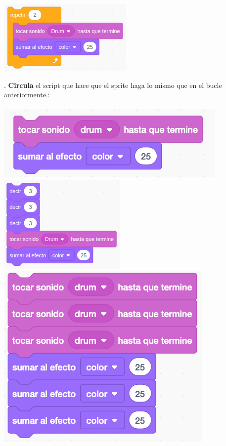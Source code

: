\documentclass[letterpaper,12pt]{article}
\begin{document}
\noindent \dotfill

\begin{center}
\includegraphics[scale=.7]{q4_script0.png}
\end{center}

. \textbf{Circula} el script que hace que el sprite haga lo mismo que en el bucle anteriormente.: \\ \\
\includegraphics[scale=.625,valign=t]{q4_script1.png} \hspace{.01cm}
\includegraphics[scale=.625,valign=t]{q4_script2.png} \hspace{.01cm}
\includegraphics[scale=.625,valign=t]{q4_script3.png} \hspace{.01cm}
\end{document}
